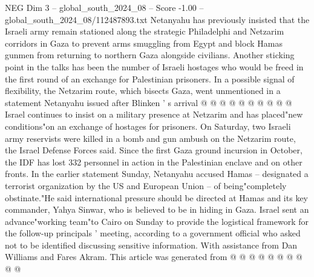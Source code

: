 \begin{textsample}{NEG Dim 3 – global\_south\_2024\_08 – Score -1.00 – global\_south\_2024\_08/112487893.txt}
Netanyahu has previously insisted that the Israeli army remain stationed along the strategic Philadelphi and Netzarim corridors in Gaza to prevent arms smuggling from Egypt and block Hamas gunmen from returning to northern Gaza alongside civilians.
Another sticking point in the talks has been the number of Israeli hostages who would be freed in the first round of an exchange for Palestinian prisoners.
In a possible signal of flexibility, the Netzarim route, which bisects Gaza, went unmentioned in a statement Netanyahu issued after Blinken ' s arrival @ @ @ @ @ @ @ @ @ @ Israel continues to insist on a military presence at Netzarim and has placed"new conditions"on an exchange of hostages for prisoners.
On Saturday, two Israeli army reservists were killed in a bomb and gun ambush on the Netzarim route, the Israel Defense Forces said.
Since the first Gaza ground incursion in October, the IDF has lost 332 personnel in action in the Palestinian enclave and on other fronts.
In the earlier statement Sunday, Netanyahu accused Hamas -- designated a terrorist organization by the US and European Union -- of being"completely obstinate."He said international pressure should be directed at Hamas and its key commander, Yahya Sinwar, who is believed to be in hiding in Gaza.
Israel sent an advance"working team"to Cairo on Sunday to provide the logistical framework for the follow-up principals ' meeting, according to a government official who asked not to be identified discussing sensitive information.
With assistance from Dan Williams and Fares Akram.
This article was generated from @ @ @ @ @ @ @ @ @ @

\end{textsample}

